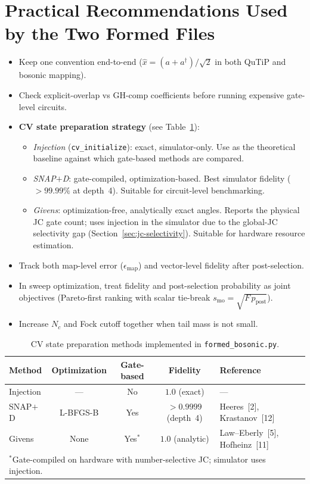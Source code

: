 \documentclass[11pt]{article}
\begin{document}
\section{Practical Recommendations Used by the Two Formed Files}
\begin{itemize}
\item Keep one convention end-to-end ($\hat{x}=(a+a^\dagger)/\sqrt{2}$ in both QuTiP and bosonic mapping).
\item Check explicit-overlap vs GH-comp coefficients before running expensive gate-level circuits.
\item \textbf{CV state preparation strategy} (see Table~\ref{tab:stateprep}):
  \begin{itemize}
  \item \emph{Injection} (\texttt{cv\_initialize}): exact, simulator-only.
    Use as the theoretical baseline against which gate-based methods are compared.
  \item \emph{SNAP$+$D}: gate-compiled, optimization-based.
    Best simulator fidelity ($>99.99\%$ at depth~4).
    Suitable for circuit-level benchmarking.
  \item \emph{Givens}: optimization-free, analytically exact angles.
    Reports the physical JC gate count; uses injection in the simulator
    due to the global-JC selectivity gap (Section~\ref{sec:jc-selectivity}).
    Suitable for hardware resource estimation.
  \end{itemize}
\item Track both map-level error ($\epsilon_{\mathrm{map}}$) and vector-level fidelity after post-selection.
\item In sweep optimization, treat fidelity and post-selection probability as
  joint objectives (Pareto-first ranking with scalar tie-break
  $s_{\mathrm{mo}}=\sqrt{F\,p_{\mathrm{post}}}$).
\item Increase $N_c$ and Fock cutoff together when tail mass is not small.
\end{itemize}

\begin{table}[h]
\centering
\caption{CV state preparation methods implemented in \texttt{formed\_bosonic.py}.}
\label{tab:stateprep}
\begin{tabular}{lcccl}
\toprule
Method & Optimization & Gate-based & Fidelity & Reference \\
\midrule
Injection   & --- & No  & $1.0$ (exact) & --- \\
SNAP$+$D    & L-BFGS-B & Yes & $>0.9999$ (depth~4) & Heeres~[2], Krastanov~[12] \\
Givens      & None     & Yes$^*$ & $1.0$ (analytic) & Law--Eberly~[5], Hofheinz~[11] \\
\bottomrule
\multicolumn{5}{l}{\footnotesize $^*$Gate-compiled on hardware with number-selective JC; simulator uses injection.}
\end{tabular}
\end{table}
\end{document}
